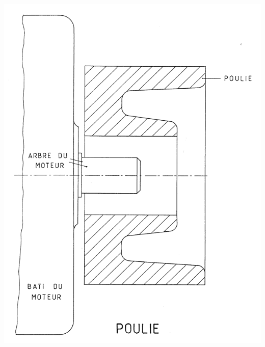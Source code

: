 \documentclass[11pt,oneside]{article}
\begin{document}
\newpage 


\begin{center}
\includegraphics[width=.95\textwidth]{png/dessin}
\end{center}

\end{document}
